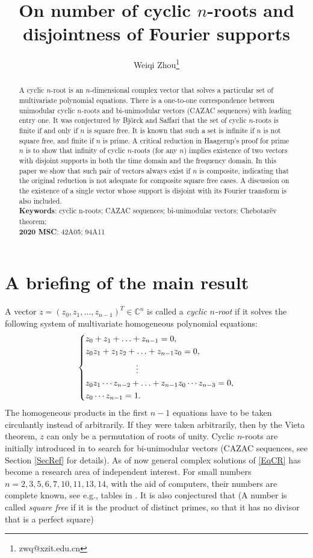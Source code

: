 \documentclass[A4,11pt]{article}
\title{On number of cyclic $n$-roots and disjointness of Fourier supports}
\author{Weiqi Zhou\thanks{zwq@xzit.edu.cn}}
\affil{\small School of Mathematics and Statistics, Xuzhou University of Technology \\  {\footnotesize Lishui Road 2, Yunlong District, Xuzhou, Jiangsu Province, China 221018}}
\date{}
\begin{document}
\maketitle
\begin{abstract}
A cyclic $n$-root is an $n$-dimensional complex vector that solves a particular set of multivariate polynomial equations. There is a one-to-one correspondence between unimodular cyclic $n$-roots and bi-unimodular vectors (CAZAC sequences) with leading entry one. It was conjectured by Bj{\"o}rck and Saffari that the set of cyclic $n$-roots is finite if and only if $n$ is square free. It is known that such a set is infinite if $n$ is not square free, and finite if $n$ is prime. A critical reduction in Haagerup's proof for prime $n$ is to show that infinity of cyclic $n$-roots (for any $n$) implies existence of two vectors with disjoint supports in both the time domain and the frequency domain. In this paper we show that such pair of vectors always exist if $n$ is composite, indicating that the original reduction is not adequate for composite square free cases. A discussion on the existence of a single vector whose support is disjoint with its Fourier transform is also included. \\

{\noindent
{\bf Keywords}: cyclic n-roots; CAZAC sequences; bi-unimodular vectors; Chebotar\"ev theorem;
\\[1ex]
{\bf 2020 MSC}: 42A05; 94A11}
\end{abstract}

\section{A briefing of the main result}
A vector $z=(z_0,z_1,\ldots,z_{n-1})^T\in\mathbb C^n$ is called a \emph{cyclic $n$-root} if it solves the following system of multivariate homogeneous polynomial equations:
\begin{equation} \label{EqCycR}
\begin{dcases}
z_0+z_1+\ldots+z_{n-1}=0, \\
z_0z_1+z_1z_2+\ldots+z_{n-1}z_0=0, \\
\quad\quad\quad\quad\quad\quad\vdots \\
z_0z_1\cdots z_{n-2}+\ldots+z_{n-1}z_0\cdots z_{n-3}=0, \\
z_0\cdots z_{n-1}=1.
\end{dcases}
\end{equation}
The homogeneous products in the first $n-1$ equations have to be taken circulantly instead of arbitrarily. If they were taken arbitrarily, then by the Vieta theorem, $z$ can only be a permutation of roots of unity. Cyclic $n$-roots are initially introduced in \cite{bjorck1990} to search for bi-unimodular vectors (CAZAC sequences, see Section \ref{SecRef} for details). As of now general complex solutions of \eqref{EqCR} has become a research area of independent interest. For small numbers $n=2,3,5,6,7,10,11,13,14$, with the aid of computers, their numbers are complete known, see e.g., tables in \cite{benedetto2019, fuhr2015}. It is also conjectured that (A number is called \emph{square free} if it is the product of distinct primes, so that it has no divisor that is a perfect square)
\end{document}
